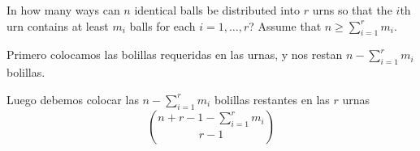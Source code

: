 \item In how many ways can $n$ identical balls be distributed into $r$ urns so that the $i$th urn contains at least $m_i$ balls for each $i = 1,\dots,r$? Assume that $n \ge \sum_{i=1}^r m_i$.

Primero colocamos las bolillas requeridas en las urnas, y nos restan $n - \sum_{i=1}^r m_i$ bolillas.

Luego debemos colocar las $n - \sum_{i=1}^r m_i$ bolillas restantes en las $r$ urnas
\[ \binom{ n + r - 1 - \sum_{i=1}^r m_i}{r-1} \]
